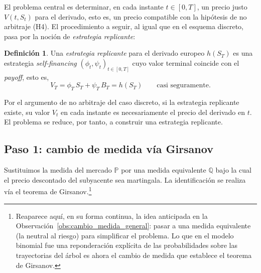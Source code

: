 \documentclass[11pt,a4paper,oneside]{report}
\theoremstyle{plain}
\theoremstyle{definition}
\newtheorem{definicion}[teorema]{Definición}
\theoremstyle{remark}
\newcommand{\PP}{\mathbb{P}}
\newcommand{\Q}{\mathbb{Q}}
\newcommand{\1}{\mathbf{1}}
\begin{document}
El problema central es
determinar, en cada instante $t \in [0, T]$, un precio justo $V(t,
S_t)$ para el derivado, esto es, un precio compatible con la hipótesis
de no arbitraje (H4). El procedimiento a seguir, al igual que en el esquema discreto, pasa
por la noción de \emph{estrategia replicante}:

\begin{definicion}
\label{def:estrategia_replicante}
Una \emph{estrategia replicante} para el derivado europeo $h(S_T)$ es
una estrategia \emph{self-financing} $(\phi_t, \psi_t)_{t \in [0, T]}$
cuyo valor terminal coincide con el \emph{payoff}, esto es,
\begin{equation*}
  V_T = \phi_T\, S_T + \psi_T\, B_T = h(S_T)
  \qquad \text{casi seguramente}.
\end{equation*}
\end{definicion}

Por el argumento de no arbitraje del caso discreto, si la estrategia
replicante existe, su valor $V_t$ en cada instante es necesariamente
el precio del derivado en $t$. El problema se reduce, por tanto, a
construir una estrategia replicante.

\subsection{Paso 1: cambio de medida vía Girsanov}
\label{subsec:paso1_girsanov}

Sustituimos la medida del mercado $\PP$ por una medida equivalente
$\Q$ bajo la cual el precio descontado del subyacente sea martingala.
La identificación se realiza vía el teorema de Girsanov.\footnote{Reaparece aquí, en su forma continua, la idea anticipada en la
Observación~\ref{obs:cambio_medida_general}: pasar a una medida
equivalente (la neutral al riesgo) para simplificar el problema. Lo
que en el modelo binomial fue una reponderación explícita de las
probabilidades sobre las trayectorias del árbol es ahora el cambio de
medida que establece el teorema de Girsanov.}
\end{document}
